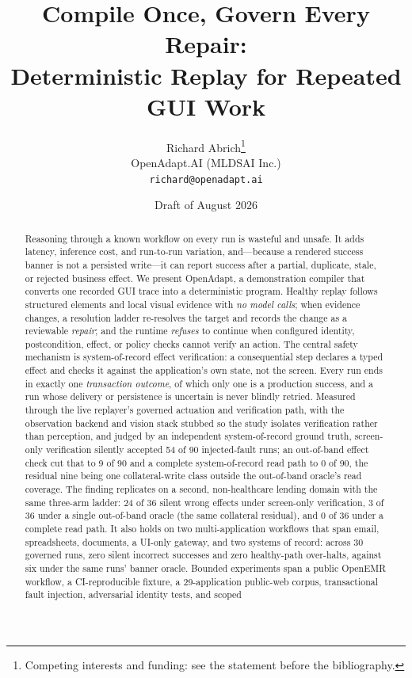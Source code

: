\documentclass[10pt]{article}
\title{Compile Once, Govern Every Repair:\\Deterministic Replay for Repeated GUI Work}
\author{Richard Abrich\thanks{Competing interests and funding: see the
statement before the bibliography.}\\
OpenAdapt.AI (MLDSAI Inc.)\\
\texttt{richard@openadapt.ai}}
\date{Draft of August 2026}
\newcommand{\system}{OpenAdapt}
\begin{document}
\maketitle

\begin{abstract}
Reasoning through a known workflow on every run is wasteful and unsafe. It adds
latency, inference cost, and run-to-run variation, and---because a rendered
success banner is not a persisted write---it can report success after a partial,
duplicate, stale, or rejected business effect. We present \system{}, a
demonstration compiler that converts one recorded GUI trace into a deterministic
program. Healthy replay follows structured elements and local visual evidence
with \emph{no model calls}; when evidence changes, a resolution ladder
re-resolves the target and records the change as a reviewable \emph{repair}; and
the runtime \emph{refuses} to continue when configured identity, postcondition,
effect, or policy checks cannot verify an action. The central safety mechanism is
system-of-record effect verification: a consequential step declares a typed
effect and checks it against the application's own state, not the screen. Every
run ends in exactly one \emph{transaction outcome}, of which only one is a
production success, and a run whose delivery or persistence is uncertain is
never blindly retried.
Measured through the live replayer's governed actuation and verification path,
with the observation backend and vision stack stubbed so the study isolates
verification rather than perception, and judged by an independent
system-of-record ground truth, screen-only verification silently accepted 54 of
90 injected-fault runs; an out-of-band effect check cut that to 9 of 90 and a
complete system-of-record read path to 0 of 90, the residual nine being one
collateral-write class outside the out-of-band oracle's read coverage. The
finding replicates on a second, non-healthcare lending domain with the same
three-arm ladder: 24 of 36 silent wrong effects under screen-only verification,
3 of 36 under a single out-of-band oracle (the same collateral residual), and
0 of 36 under a complete read path. It also holds on two multi-application
workflows that span email, spreadsheets, documents, a UI-only gateway, and two
systems of record: across 30 governed runs, zero silent incorrect successes and
zero healthy-path over-halts, against six under the same runs' banner oracle.
Bounded experiments span a public OpenEMR
workflow, a CI-reproducible fixture, a 29-application public-web corpus,
transactional fault injection, adversarial identity tests, and scoped

\end{abstract}
\end{document}
